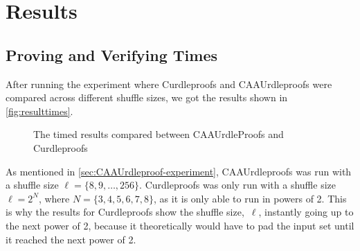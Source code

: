 \section{Results}\label{sec:results}
\subsection{Proving and Verifying Times}\label{subsec:results:provingverifying}

After running the experiment where Curdleproofs and CAAUrdleproofs were compared across different shuffle sizes, we got the results shown in \autoref{fig:resulttimes}.

\begin{figure}[!htb]
    \centering
    \qquad
    \caption{The timed results compared between CAAUrdleProofs and Curdleproofs}%
    \label{fig:resulttimes}%
\end{figure}

As mentioned in \autoref{sec:CAAUrdleproof-experiment}, CAAUrdleproofs was run with a shuffle size $\ell=\{8,9,\dots,256\}$.
Curdleproofs was only run with a shuffle size $\ell = 2^N$, where $N = \{3,4,5,6,7,8\}$, as it is only able to run in powers of 2.
This is why the results for Curdleproofs show the shuffle size,~$\ell$, instantly going up to the next power of 2, because it theoretically would have to pad the input set until it reached the next power of 2.

